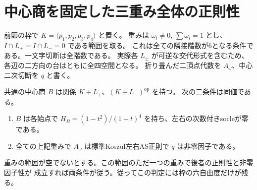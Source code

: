 \section{中心商を固定した三重み全体の正則性}
\label{sec:half-period-weight-fibers}
前節の枠で $K=\langle p_1,p_2,p_3,p_4\rangle$ と置く。
重みは $\omega_i\ne0$, $\sum\omega_i=1$ とし、$I\cap L_+=I\cap L_-=0$ である範囲を取る。
これは全ての隣接階数が6となる条件である。一文字切断は全階数である。
実際各 $L_\pm$ が可逆な交代形式を含むため、各辺の二方向の台はともに全四空間となる。
折り畳んだ二頂点代数を $A_\omega$、中心二次切断を $q$ と書く。
\begin{theorem}\label{thm:half-period-weight-fibers}
共通の中心商 $B$ は関係 $K+L_+$、$(K+L_-)^{\mathrm{op}}$ を持つ。
次の二条件は同値である。
\begin{enumerate}
\item $B$ は各始点で $H_B=(1-t^2)/(1-t)^4$ を持ち、左右の次数付きsocleが零である。
\item 全ての上記重みで $A_\omega$ は標準Koszul左右AS正則で $q$ は非零因子である。
\end{enumerate}
重みの範囲が空でないとする。この範囲のただ一つの重みで後者の正則性と非零因子性が
成立すれば両条件が従う。従ってこの判定には枠の六自由度だけが残る。
\end{theorem}
